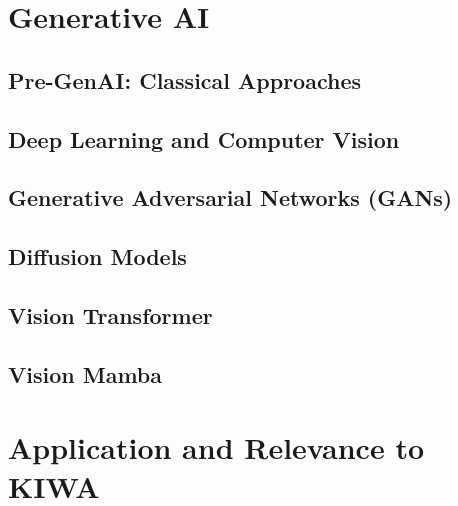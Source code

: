 \section{Generative AI}
\subsection{Pre-GenAI: Classical Approaches}
\subsection{Deep Learning and Computer Vision}
\subsection{Generative Adversarial Networks (GANs)}
\subsection{Diffusion Models}
\subsection{Vision Transformer}
\subsection{Vision Mamba}

\section{Application and Relevance to KIWA}


